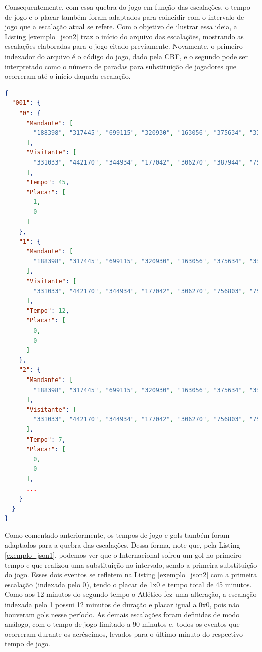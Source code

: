 Consequentemente, com essa quebra do jogo em função das escalações, o tempo de jogo e o placar também foram adaptados para coincidir com o intervalo de jogo que a escalação atual se refere. Com o objetivo de ilustrar essa ideia, a Listing \ref{exemplo_json2} traz o início do arquivo das escalações, mostrando as escalações elaboradas para o jogo citado previamente. Novamente, o primeiro indexador do arquivo é o código do jogo, dado pela CBF, e o segundo pode ser interpretado como o número de paradas para substituição de jogadores que ocorreram até o início daquela escalação.
\begin{lstlisting}[language = json, firstnumber = 1, caption = {Exemplo do JSON final.}, captionpos = b, label = exemplo_json2]
{
  "001": {
    "0": {
      "Mandante": [
        "188398", "317445", "699115", "320930", "163056", "375634", "339258", "295792", "438212", "339266", "370997"
      ],
      "Visitante": [
        "331033", "442170", "344934", "177042", "306270", "387944", "756803", "750897", "648335", "320839", "542337"
      ],
      "Tempo": 45,
      "Placar": [
        1,
        0
      ]
    },
    "1": {
      "Mandante": [
        "188398", "317445", "699115", "320930", "163056", "375634", "339258", "295792", "438212", "339266", "370997"
      ],
      "Visitante": [
        "331033", "442170", "344934", "177042", "306270", "756803", "750897", "648335", "320839", "542337", "723593"
      ],
      "Tempo": 12,
      "Placar": [
        0,
        0
      ]
    },
    "2": {
      "Mandante": [
        "188398", "317445", "699115", "320930", "163056", "375634", "339258", "438212", "339266", "370997", "703937"
      ],
      "Visitante": [
        "331033", "442170", "344934", "177042", "306270", "756803", "750897", "648335", "320839", "542337", "723593"
      ],
      "Tempo": 7,
      "Placar": [
        0,
        0
      ],
      ...
    }
  }
}
\end{lstlisting}

Como comentado anteriormente, os tempos de jogo e gols também foram adaptados para a quebra das escalações. Dessa forma, note que, pela Listing \ref{exemplo_json1}, podemos ver que o Internacional sofreu um gol no primeiro tempo e que realizou uma substituição no intervalo, sendo a primeira substituição do jogo. Esses dois eventos se refletem na Listing \ref{exemplo_json2} com a primeira escalação (indexada pelo 0), tendo o placar de 1x0 e tempo total de 45 minutos. Como aos 12 minutos do segundo tempo o Atlético fez uma alteração, a escalação indexada pelo 1 possui 12 minutos de duração e placar igual a 0x0, pois não houveram gols nesse período. As demais escalações foram definidas de modo análogo, com o tempo de jogo limitado a 90 minutos e, todos os eventos que ocorreram durante os acréscimos, levados para o último minuto do respectivo tempo de jogo.

